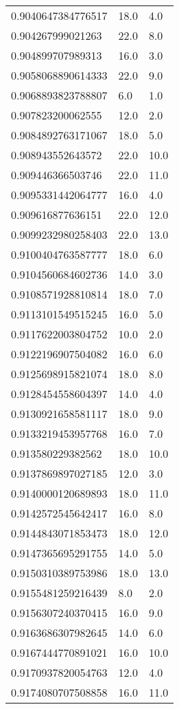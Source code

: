 \begin{center}
\begin{supertabular}[H]{p{0.30\textwidth}p{0.05\textwidth}p{0.05\textwidth}}
0.9040647384776517 & 18.0 & 4.0 \\ 
0.904267999021263 & 22.0 & 8.0 \\ 
0.904899707989313 & 16.0 & 3.0 \\ 
0.9058068890614333 & 22.0 & 9.0 \\ 
0.9068893823788807 & 6.0 & 1.0 \\ 
0.907823200062555 & 12.0 & 2.0 \\ 
0.9084892763171067 & 18.0 & 5.0 \\ 
0.908943552643572 & 22.0 & 10.0 \\ 
0.909446366503746 & 22.0 & 11.0 \\ 
0.9095331442064777 & 16.0 & 4.0 \\ 
0.909616877636151 & 22.0 & 12.0 \\ 
0.9099232980258403 & 22.0 & 13.0 \\ 
0.9100404763587777 & 18.0 & 6.0 \\ 
0.9104560684602736 & 14.0 & 3.0 \\ 
0.9108571928810814 & 18.0 & 7.0 \\ 
0.9113101549515245 & 16.0 & 5.0 \\ 
0.9117622003804752 & 10.0 & 2.0 \\ 
0.9122196907504082 & 16.0 & 6.0 \\ 
0.9125698915821074 & 18.0 & 8.0 \\ 
0.9128454558604397 & 14.0 & 4.0 \\ 
0.9130921658581117 & 18.0 & 9.0 \\ 
0.9133219453957768 & 16.0 & 7.0 \\ 
0.913580229382562 & 18.0 & 10.0 \\ 
0.9137869897027185 & 12.0 & 3.0 \\ 
0.9140000120689893 & 18.0 & 11.0 \\ 
0.9142572545642417 & 16.0 & 8.0 \\ 
0.9144843071853473 & 18.0 & 12.0 \\ 
0.9147365695291755 & 14.0 & 5.0 \\ 
0.9150310389753986 & 18.0 & 13.0 \\ 
0.9155481259216439 & 8.0 & 2.0 \\ 
0.9156307240370415 & 16.0 & 9.0 \\ 
0.9163686307982645 & 14.0 & 6.0 \\ 
0.9167444770891021 & 16.0 & 10.0 \\ 
0.9170937820054763 & 12.0 & 4.0 \\ 
0.9174080707508858 & 16.0 & 11.0 \\ 

\end{supertabular}
\end{center}
